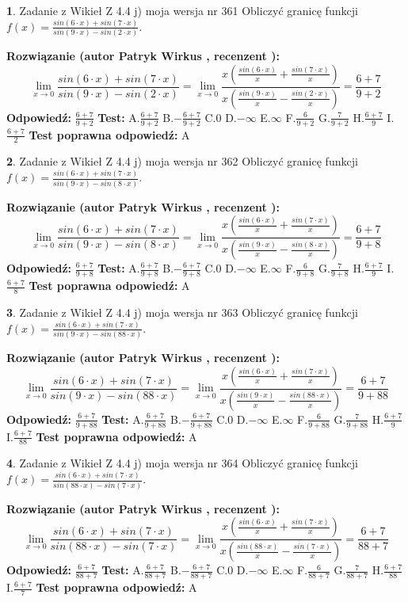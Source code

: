 \documentclass[12pt, a4paper]{article}
\theoremstyle{definition} %
\newtheorem{zad}{}
\newcommand{\zadStart}[1]{\begin{zad}#1\newline}
\newcommand{\zadStop}{\end{zad}}
\newcommand{\rozwStart}[2]{\noindent \textbf{Rozwiązanie (autor #1 , recenzent #2): }\newline}
\newcommand{\rozwStop}{\newline}
\newcommand{\odpStart}{\noindent \textbf{Odpowiedź:}\newline}
\newcommand{\odpStop}{\newline}
\newcommand{\testStart}{\noindent \textbf{Test:}\newline}
\newcommand{\testStop}{\newline}
\newcommand{\kluczStart}{\noindent \textbf{Test poprawna odpowiedź:}\newline}
\newcommand{\kluczStop}{\newline}
\begin{document}
\zadStart{Zadanie z Wikieł Z 4.4 j) moja wersja nr 361}
Obliczyć granicę funkcji $f(x)=\frac{sin(6\cdot x) +sin(7\cdot x)}{sin(9\cdot x) -sin(2\cdot x)}$.
\zadStop
\rozwStart{Patryk Wirkus}{}
$$\lim\limits_{x\to 0}\frac{sin(6\cdot x) +sin(7\cdot x)}{sin(9\cdot x) -sin(2\cdot x)}=\lim\limits_{x\to 0}\frac{x(\frac{sin(6\cdot x)}{x}+\frac{sin(7\cdot x)}{x})}{x(\frac{sin(9\cdot x)}{x}-\frac{sin(2\cdot x)}{x})}=\frac{6+7}{9+2}$$
\rozwStop
\odpStart
$\frac{6+7}{9+2}$
\odpStop
\testStart
A.$\frac{6+7}{9+2}$
B.$-\frac{6+7}{9+2}$
C.$0$
D.$-\infty$
E.$\infty$
F.$\frac{6}{9+2}$
G.$\frac{7}{9+2}$
H.$\frac{6+7}{9}$
I.$\frac{6+7}{2}$
\testStop
\kluczStart
A
\kluczStop



\zadStart{Zadanie z Wikieł Z 4.4 j) moja wersja nr 362}
Obliczyć granicę funkcji $f(x)=\frac{sin(6\cdot x) +sin(7\cdot x)}{sin(9\cdot x) -sin(8\cdot x)}$.
\zadStop
\rozwStart{Patryk Wirkus}{}
$$\lim\limits_{x\to 0}\frac{sin(6\cdot x) +sin(7\cdot x)}{sin(9\cdot x) -sin(8\cdot x)}=\lim\limits_{x\to 0}\frac{x(\frac{sin(6\cdot x)}{x}+\frac{sin(7\cdot x)}{x})}{x(\frac{sin(9\cdot x)}{x}-\frac{sin(8\cdot x)}{x})}=\frac{6+7}{9+8}$$
\rozwStop
\odpStart
$\frac{6+7}{9+8}$
\odpStop
\testStart
A.$\frac{6+7}{9+8}$
B.$-\frac{6+7}{9+8}$
C.$0$
D.$-\infty$
E.$\infty$
F.$\frac{6}{9+8}$
G.$\frac{7}{9+8}$
H.$\frac{6+7}{9}$
I.$\frac{6+7}{8}$
\testStop
\kluczStart
A
\kluczStop



\zadStart{Zadanie z Wikieł Z 4.4 j) moja wersja nr 363}
Obliczyć granicę funkcji $f(x)=\frac{sin(6\cdot x) +sin(7\cdot x)}{sin(9\cdot x) -sin(88\cdot x)}$.
\zadStop
\rozwStart{Patryk Wirkus}{}
$$\lim\limits_{x\to 0}\frac{sin(6\cdot x) +sin(7\cdot x)}{sin(9\cdot x) -sin(88\cdot x)}=\lim\limits_{x\to 0}\frac{x(\frac{sin(6\cdot x)}{x}+\frac{sin(7\cdot x)}{x})}{x(\frac{sin(9\cdot x)}{x}-\frac{sin(88\cdot x)}{x})}=\frac{6+7}{9+88}$$
\rozwStop
\odpStart
$\frac{6+7}{9+88}$
\odpStop
\testStart
A.$\frac{6+7}{9+88}$
B.$-\frac{6+7}{9+88}$
C.$0$
D.$-\infty$
E.$\infty$
F.$\frac{6}{9+88}$
G.$\frac{7}{9+88}$
H.$\frac{6+7}{9}$
I.$\frac{6+7}{88}$
\testStop
\kluczStart
A
\kluczStop



\zadStart{Zadanie z Wikieł Z 4.4 j) moja wersja nr 364}
Obliczyć granicę funkcji $f(x)=\frac{sin(6\cdot x) +sin(7\cdot x)}{sin(88\cdot x) -sin(7\cdot x)}$.
\zadStop
\rozwStart{Patryk Wirkus}{}
$$\lim\limits_{x\to 0}\frac{sin(6\cdot x) +sin(7\cdot x)}{sin(88\cdot x) -sin(7\cdot x)}=\lim\limits_{x\to 0}\frac{x(\frac{sin(6\cdot x)}{x}+\frac{sin(7\cdot x)}{x})}{x(\frac{sin(88\cdot x)}{x}-\frac{sin(7\cdot x)}{x})}=\frac{6+7}{88+7}$$
\rozwStop
\odpStart
$\frac{6+7}{88+7}$
\odpStop
\testStart
A.$\frac{6+7}{88+7}$
B.$-\frac{6+7}{88+7}$
C.$0$
D.$-\infty$
E.$\infty$
F.$\frac{6}{88+7}$
G.$\frac{7}{88+7}$
H.$\frac{6+7}{88}$
I.$\frac{6+7}{7}$
\testStop
\kluczStart
A
\kluczStop
\end{document}

